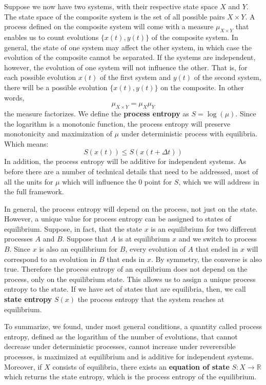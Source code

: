\documentclass[letterpaper,twocolumn]{article}
\begin{document}
Suppose we now have two systems, with their respective state space $X$ and $Y$. The state space of the composite system is the set of all possible pairs $X \times Y$. A process defined on the composite system will come with a measure $\mu_{X \times Y}$ that enables us to count evolutions $\{x(t), y(t)\}$ of the composite system. In general, the state of one system may affect the other system, in which case the evolution of the composite cannot be separated. If the systems are independent, however, the evolution of one system will not influence the other. That is, for each possible evolution $x(t)$ of the first system and $y(t)$ of the second system, there will be a possible evolution $\{x(t), y(t)\}$ on the composite. In other words,
\begin{equation}
	\mu_{X \times Y} = \mu_X \mu_Y
\end{equation}
the measure factorizes. We define the \textbf{process entropy} as $S = \log(\mu)$. Since the logarithm is a monotonic function, the process entropy will preserve monotonicity and maximization of $\mu$ under deterministic process with equilibria. Which means:
\begin{equation}\label{ov_entropy_increases}
S(x(t)) \leq S(x(t + \Delta t))
\end{equation}
In addition, the process entropy will be additive for independent systems. As before there are a number of technical details that need to be addressed, most of all the units for $\mu$ which will influence the 0 point for $S$, which we will address in the full framework.

In general, the process entropy will depend on the process, not just on the state. However, a unique value for process entropy can be assigned to states of equilibrium. Suppose, in fact, that the state $x$ is an equilibrium for two different processes $A$ and $B$. Suppose that $A$ is at equilibrium $x$ and we switch to process $B$. Since $x$ is also an equilibrium for $B$, every evolution of $A$ that ended in $x$ will correspond to an evolution in $B$ that ends in $x$. By symmetry, the converse is also true. Therefore the process entropy of an equilibrium does not depend on the process, only on the equilibrium state. This allows us to assign a unique process entropy to the state. If we have set of states that are equilibria, then, we call \textbf{state entropy} $S(x)$ the process entropy that the system reaches at equilibrium.

To summarize, we found, under most general conditions, a quantity called process entropy, defined as the logarithm of the number of evolutions, that cannot decrease under deterministic processes, cannot increase under reverersible processes, is maximized at equilibrium and is additive for independent systems. Moreover, if $X$ consists of equilibria, there exists an \textbf{equation of state} $S : X \to \mathbb{R}$ which returns the state entropy, which is the process entropy of the equilibrium.
\end{document}
